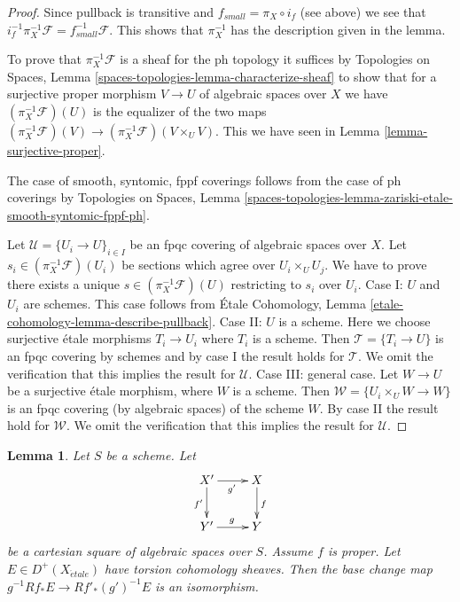 \documentclass{stacks-project}
\theoremstyle{plain}
\newtheorem{lemma}[subsection]{Lemma}
\theoremstyle{definition}
\theoremstyle{remark}
\numberwithin{equation}{subsection}
\def\etale{{\acute{e}tale}}
\begin{document}
\begin{proof}
Since pullback is transitive and $f_{small} = \pi_X \circ i_f$
(see above) we see that
$i_f^{-1} \pi_X^{-1}\mathcal{F} = f_{small}^{-1}\mathcal{F}$.
This shows that $\pi_X^{-1}$ has the description given in the lemma.

\medskip\noindent
To prove that $\pi_X^{-1}\mathcal{F}$ is a sheaf for the ph topology
it suffices by Topologies on Spaces, Lemma
\ref{spaces-topologies-lemma-characterize-sheaf}
to show that for a surjective proper morphism
$V \to U$ of algebraic spaces over $X$ we have
$(\pi_X^{-1}\mathcal{F})(U)$ is the equalizer of the two maps
$(\pi_X^{-1}\mathcal{F})(V) \to (\pi_X^{-1}\mathcal{F})(V \times_U V)$.
This we have seen in Lemma \ref{lemma-surjective-proper}.

\medskip\noindent
The case of smooth, syntomic, fppf coverings follows from the case
of ph coverings by Topologies on Spaces, Lemma
\ref{spaces-topologies-lemma-zariski-etale-smooth-syntomic-fppf-ph}.

\medskip\noindent
Let $\mathcal{U} = \{U_i \to U\}_{i \in I}$ be an fpqc covering of algebraic
spaces over $X$. Let $s_i \in (\pi_X^{-1}\mathcal{F})(U_i)$ be sections
which agree over $U_i \times_U U_j$. We have to prove there exists a unique
$s \in (\pi_X^{-1}\mathcal{F})(U)$ restricting to $s_i$ over $U_i$.
Case I: $U$ and $U_i$ are schemes. This case follows from
\'Etale Cohomology, Lemma \ref{etale-cohomology-lemma-describe-pullback}.
Case II: $U$ is a scheme. Here we choose surjective \'etale morphisms
$T_i \to U_i$ where $T_i$ is a scheme. Then $\mathcal{T} = \{T_i \to U\}$ is an
fpqc covering by schemes and by case I the result holds for $\mathcal{T}$.
We omit the verification that this implies the result for $\mathcal{U}$.
Case III: general case. Let $W \to U$ be a surjective \'etale
morphism, where $W$ is a scheme. Then $\mathcal{W} = \{U_i \times_U W \to W\}$
is an fpqc covering (by algebraic spaces) of the scheme $W$.
By case II the result hold for $\mathcal{W}$.
We omit the verification that this implies the result for $\mathcal{U}$.
\end{proof}

\begin{lemma}
\label{lemma-proper-base-change}
Let $S$ be a scheme. Let
$$
\xymatrix{
X' \ar[r]_{g'} \ar[d]_{f'} & X \ar[d]^f \\
Y' \ar[r]^g & Y
}
$$
be a cartesian square of algebraic spaces over $S$. Assume $f$ is proper.
Let $E \in D^+(X_\etale)$ have torsion cohomology sheaves.
Then the base change map $g^{-1}Rf_*E \to Rf'_*(g')^{-1}E$
is an isomorphism.
\end{lemma}
\end{document}
